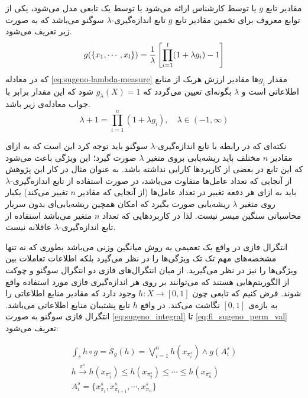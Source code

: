 مقادیر تابع $g$ یا توسط کارشناس ارائه می‌شود یا توسط یک تابعی مدل می‌شود، یکی از توابع معروف برای تخمین مقادیر تابع $g$ تابع اندازه‌گیری-$\lambda$ سوگنو می‌باشد که به صورت زیر تعریف می‌شود.
\begin{equation}\label{eq:sugeno-lambda-measure}
g(\{x_1,\cdots,x_l\}) = {1 \over \lambda}\left[\prod_{i=1}^l(1 + \lambda g_i) - 1\right]
\end{equation}
که در معادله \ref{eq:sugeno-lambda-measure} مقدار $g_i$ها مقادیر ارزش هریک از منابع اطلاعاتی است و $\lambda$ بگونه‌ای تعیین می‌گردد که $g_\lambda(X) = 1$ شود که این مقدار برابر با جواب معادله‌ی زیر باشد.
\begin{equation}\label{eq:sugeno-lambda-measure:rooting}
\lambda + 1 = \prod_{i=1}^{n} (1 + \lambda g_i), \hspace{1em} \lambda \in (-1, \infty) 
\end{equation}

نکته‌ای که در رابطه با تابع اندازه‌گیری-$\lambda$ سوگنو باید توجه کرد این است که به ازای مقادیر $n$ مختلف باید ریشه‌یابی بروی متغیر $\lambda$ صورت گیرد؛ این ویژگی‌ باعث می‌شود که این تابع در بعضی از کاربردها کارایی نداشته باشد. به عنوان مثال در کار این پژوهش از آنجایی که تعداد عامل‌ها متفاوت می‌باشد، در صورت استفاده از تابع اندازه‌گیری-$\lambda$ باید به ازای هر دفعه تغییر در تعداد عامل‌ها (از آنجایی که مقادیر $n$ تغییر می‌کند) یکبار روی متغیر $\lambda$ ریشه‌یابی صورت بگیرد که امکان همچین ریشه‌یابی‌‌ای بدون سربار محاسباتی سنگین میسر نیست. لذا در کاربردهایی که تعداد $n$ متغیر می‌باشد استفاده از تابع اندازه‌گیری-$\lambda$ عاقلانه‌ نیست.

انتگرال فازی در واقع یک تعمیمی به روش میانگین وزنی می‌باشد بطوری که نه تنها مشخصه‌های مهم تک تک ویژگی‌ها را در نظر می‌گیرد بلکه اطلاعات تعاملات بین ویژگی‌ها را نیز در نظر می‌گیرید. از میان انتگرال‌های فازی دو انتگرال سوگنو و چوکت از الگوریتم‌هایی هستند که می‌توانند بر روی هر اندازه‌گیری‌ فازی مورد استفاده واقع شوند. فرض کنیم که تابعی چون
$h : X \rightarrow [0, 1]$
وجود دارد که مقادیر منابع اطلاعاتی را به بازه‌ی $[0,1]$ نگاشت می‌کند. در واقع $h$ تابع پشتیبان منابع اطلاعاتی می‌باشد. انتگرال فازی سوگنو به صورت
\ref{eq:sugeno_integral} تا \ref{eq:fi_sugeno_perm_val}
تعریف می‌شود:

\begin{eqnarray}
\int_{s} h \circ g = \mathcal{S}_g(h) = \bigvee_{i=1}^{n} h(x_{\pi_i^s}) \wedge g(A_i^s)\label{eq:sugeno_integral}\\
h \xrightarrow{\pi^s} h(x_{\pi_1^s}) \leq h(x_{\pi_2^s}) \leq \cdots \leq h(x_{\pi_n^s})\label{eq:fi_sugeno_perm_op}\\
A_i^s = \{x_{\pi_i}^s, x_{\pi_{i+1}}^s, \cdots, x_{\pi_n}^s\}\label{eq:fi_sugeno_perm_val}
\end{eqnarray}

